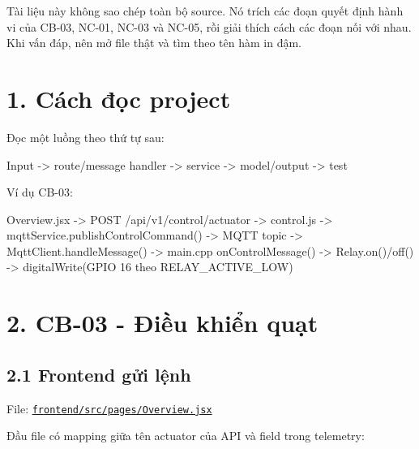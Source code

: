 \documentclass[11pt,oneside,openany]{book}
\newenvironment{Shaded}{\begin{snugshade}}{\end{snugshade}}
\newcommand{\NormalTok}[1]{\textcolor[rgb]{0.81,0.81,0.76}{#1}}
\renewenvironment{Shaded}{%
  \def\FrameCommand{\fboxsep=8pt\colorbox{shadecolor}}%
  \MakeFramed{\advance\hsize-\width\FrameRestore}%
}{\endMakeFramed}
\begin{document}
Tài liệu này không sao chép toàn bộ source. Nó trích các đoạn quyết định
hành vi của CB-03, NC-01, NC-03 và NC-05, rồi giải thích cách các đoạn
nối với nhau. Khi vấn đáp, nên mở file thật và tìm theo tên hàm in đậm.

\section{1. Cách đọc project}\label{1-cuxe1ch-ux111ux1ecdc-project}

Đọc một luồng theo thứ tự sau:

\begin{Shaded}
\begin{Highlighting}[]
\NormalTok{Input {-}\textgreater{} route/message handler {-}\textgreater{} service {-}\textgreater{} model/output {-}\textgreater{} test}
\end{Highlighting}
\end{Shaded}

Ví dụ CB-03:

\begin{Shaded}
\begin{Highlighting}[]
\NormalTok{Overview.jsx}
\NormalTok{  {-}\textgreater{} POST /api/v1/control/actuator}
\NormalTok{  {-}\textgreater{} control.js}
\NormalTok{  {-}\textgreater{} mqttService.publishControlCommand()}
\NormalTok{  {-}\textgreater{} MQTT topic}
\NormalTok{  {-}\textgreater{} MqttClient.handleMessage()}
\NormalTok{  {-}\textgreater{} main.cpp onControlMessage()}
\NormalTok{  {-}\textgreater{} Relay.on()/off()}
\NormalTok{  {-}\textgreater{} digitalWrite(GPIO 16 theo RELAY\_ACTIVE\_LOW)}
\end{Highlighting}
\end{Shaded}

\section{2. CB-03 - Điều khiển
quạt}\label{2-cb-03---ux111iux1ec1u-khiux1ec3n-quux1ea1t}

\subsection{2.1 Frontend gửi lệnh}\label{21-frontend-gux1eedi-lux1ec7nh}

File:
\href{../frontend/src/pages/Overview.jsx}{\nolinkurl{frontend/src/pages/Overview.jsx}}

Đầu file có mapping giữa tên actuator của API và field trong telemetry:
\end{document}
